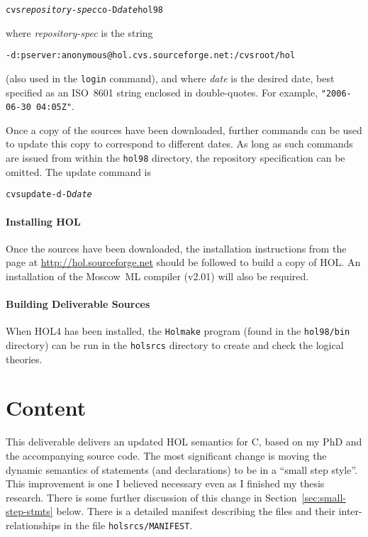 \documentclass[11pt]{article}
\begin{document}
{\small
\begin{alltt}
   cvs \textit{repository-spec} co -D \textit{date} hol98
\end{alltt}
}

\noindent where \textit{\ttfamily repository-spec} is the string

{\small
\begin{alltt}
   -d:pserver:anonymous@hol.cvs.sourceforge.net:/cvsroot/hol
\end{alltt}
}

\noindent (also used in the \texttt{login} command), and where
\textit{\ttfamily date} is the desired date, best specified as an
ISO~8601 string enclosed in double-quotes.  For example,
\texttt{"2006-06-30 04:05Z"}.

Once a copy of the sources have been downloaded, further commands can
be used to update this copy to correspond to different dates.  As long
as such commands are issued from within the \texttt{hol98} directory,
the repository specification can be omitted.  The update command is

{\small
\begin{alltt}
   cvs update -d -D \textit{date}
\end{alltt}
}

\paragraph{Installing HOL} Once the sources have been downloaded, the
installation instructions from the page at
\url{http://hol.sourceforge.net} should be followed to build a copy of
HOL.  An installation of the Moscow~ML compiler (v2.01) will also be
required.

\paragraph{Building Deliverable Sources}
When HOL4 has been installed, the \texttt{Holmake} program (found in
the \texttt{hol98/bin} directory) can be run in the \texttt{holsrcs}
directory to create and check the logical theories.

\section{Content}

This deliverable delivers an updated HOL semantics for C, based on my
PhD and the accompanying source code.  The most significant change is
moving the dynamic semantics of statements (and declarations) to be in
a ``small step style''.  This improvement is one I believed necessary
even as I finished my thesis research.  There is some further
discussion of this change in Section~\ref{sec:small-step-stmts}
below.  There is a detailed manifest describing the files and their
inter-relationships in the file \texttt{holsrcs/MANIFEST}.
\end{document}
